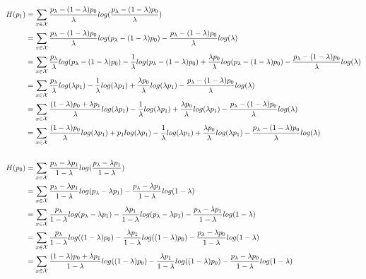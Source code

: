 \documentclass{article}
\begin{document}
\begin{align*}
H(p_1) &= \sum_{x \in \fancyx} \frac{p_\lambda - (1-\lambda)p_0}{\lambda} log(\frac{p_\lambda - (1-\lambda)p_0}{\lambda})\\
&= \sum_{x \in \fancyx} \frac{p_\lambda - (1-\lambda)p_0}{\lambda} log(p_\lambda - (1-\lambda)p_0) - \frac{p_\lambda - (1-\lambda)p_0}{\lambda} log(\lambda)\\
&= \sum_{x \in \fancyx} \frac{p_\lambda}{\lambda} log(p_\lambda - (1-\lambda)p_0) 
 - \frac{1}{\lambda} log(p_\lambda - (1-\lambda)p_0) 
  + \frac{\lambda p_0}{\lambda} log(p_\lambda - (1-\lambda)p_0) - \frac{p_\lambda - (1-\lambda)p_0}{\lambda} log(\lambda)\\
  &= \sum_{x \in \fancyx} \frac{p_\lambda}{\lambda} log(\lambda p_1) 
 - \frac{1}{\lambda} log(\lambda p_1) 
  + \frac{\lambda p_0}{\lambda} log(\lambda p_1) - \frac{p_\lambda - (1-\lambda)p_0}{\lambda} log(\lambda)\\
&= \sum_{x \in \fancyx} \frac{(1-\lambda)p_0 + \lambda p_1}{\lambda} log(\lambda p_1) 
 - \frac{1}{\lambda} log(\lambda p_1) 
  + \frac{\lambda p_0}{\lambda} log(\lambda p_1) - \frac{p_\lambda - (1-\lambda)p_0}{\lambda} log(\lambda)\\
  &= \sum_{x \in \fancyx} \frac{(1-\lambda)p_0}{\lambda} log(\lambda p_1) + p_1  log(\lambda p_1)
 - \frac{1}{\lambda} log(\lambda p_1) 
  + \frac{\lambda p_0}{\lambda} log(\lambda p_1) - \frac{p_\lambda - (1-\lambda)p_0}{\lambda} log(\lambda)\\
    \\
H(p_0) &= \sum_{x \in \fancyx} \frac{p_\lambda - \lambda p_1}{1- \lambda} log(\frac{p_\lambda - \lambda p_1}{1- \lambda})\\
&= \sum_{x \in \fancyx} \frac{p_\lambda - \lambda p_1}{1- \lambda} log(p_\lambda - \lambda p_1) - \frac{p_\lambda - \lambda p_1}{1- \lambda} log(1- \lambda)\\
&= \sum_{x \in \fancyx} \frac{p_\lambda}{1- \lambda} log(p_\lambda - \lambda p_1) - \frac{\lambda p_1}{1- \lambda}log(p_\lambda - \lambda p_1) - \frac{p_\lambda - \lambda p_1}{1- \lambda} log(1- \lambda)\\
&= \sum_{x \in \fancyx} \frac{p_\lambda}{1- \lambda} log((1 - \lambda) p_0) - \frac{\lambda p_1}{1- \lambda}log((1- \lambda) p_0) - \frac{p_\lambda - \lambda p_0}{1- \lambda} log(1- \lambda)\\
&= \sum_{x \in \fancyx} \frac{(1-\lambda) p_0 + \lambda p_1}{1- \lambda} log((1 - \lambda) p_0) - \frac{\lambda p_1}{1- \lambda}log((1- \lambda) p_0) - \frac{p_\lambda - \lambda p_0}{1- \lambda} log(1- \lambda)\\

\end{align*}
\end{document}
